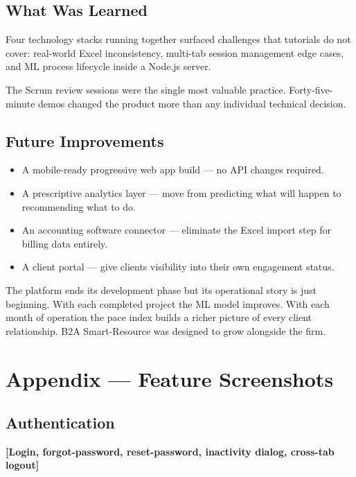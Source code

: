 \documentclass[12pt,a4paper]{report}
\begin{document}
\section{What Was Learned}

Four technology stacks running together surfaced challenges that tutorials do not
cover: real-world Excel inconsistency, multi-tab session management edge cases, and
ML process lifecycle inside a Node.js server.

The Scrum review sessions were the single most valuable practice. Forty-five-minute
demos changed the product more than any individual technical decision.

\section{Future Improvements}

\begin{itemize}
  \item A mobile-ready progressive web app build --- no API changes required.
  \item A prescriptive analytics layer --- move from predicting what will happen to
        recommending what to do.
  \item An accounting software connector --- eliminate the Excel import step for
        billing data entirely.
  \item A client portal --- give clients visibility into their own engagement status.
\end{itemize}

The platform ends its development phase but its operational story is just beginning.
With each completed project the ML model improves. With each month of operation the
pace index builds a richer picture of every client relationship. B2A Smart-Resource
was designed to grow alongside the firm.

\appendix
\chapter*{Appendix --- Feature Screenshots}
\thispagestyle{plain}

\section*{Authentication}\label{annex:Authentication}
\begin{placeholder}\textbf{[Login, forgot-password, reset-password, inactivity dialog, cross-tab logout]}\end{placeholder}
\end{document}
